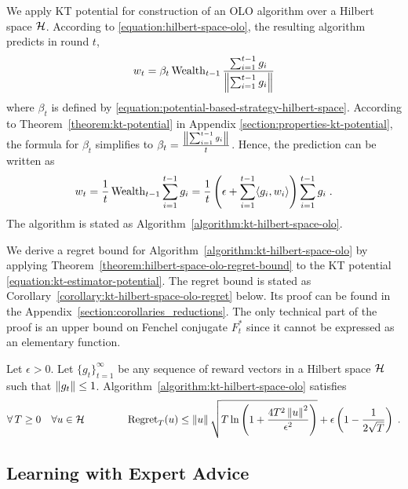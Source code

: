 We apply KT potential for construction of an OLO algorithm over a Hilbert
space $\mathcal{H}$. According to \eqref{equation:hilbert-space-olo}, the resulting algorithm predicts
in round $t$,
$$
w_t = \beta_t \operatorname{Wealth}_{t-1} \frac{\sum_{i=1}^{t-1} g_i}{\left\|{\sum_{i=1}^{t-1} g_i}\right\|}
$$
where $\beta_t$ is defined by
\eqref{equation:potential-based-strategy-hilbert-space}. According to
Theorem~\ref{theorem:kt-potential} in Appendix
\ref{section:properties-kt-potential}, the formula for $\beta_t$ simplifies to
$\beta_t = \frac{\left\|{\sum_{i=1}^{t-1} g_i}\right\|}{t}$. Hence, the prediction can be
written as
$$
w_t
= \frac{1}{t} \operatorname{Wealth}_{t-1} \sum_{i=1}^{t-1} g_i
= \frac{1}{t} \left(\epsilon + \sum_{i=1}^{t-1} \langle g_i, w_i \rangle \right) \sum_{i=1}^{t-1} g_i \; .
$$
The algorithm is stated as Algorithm~\ref{algorithm:kt-hilbert-space-olo}.

We derive a regret bound for Algorithm~\ref{algorithm:kt-hilbert-space-olo} by
applying Theorem~\ref{theorem:hilbert-space-olo-regret-bound} to the KT
potential \eqref{equation:kt-estimator-potential}. The regret bound is stated as
Corollary~\ref{corollary:kt-hilbert-space-olo-regret} below. Its proof can be
found in the Appendix~\ref{section:corollaries_reductions}. The only technical
part of the proof is an upper bound on Fenchel conjugate $F_t^*$ since it cannot
be expressed as an elementary function.

\begin{corollary}
\label{corollary:kt-hilbert-space-olo-regret}
Let $\epsilon > 0$. Let $\{g_t\}_{t=1}^\infty$ be any sequence of reward vectors
in a Hilbert space $\mathcal{H}$ such that $\left\|{g_t}\right\| \le 1$.
Algorithm~\ref{algorithm:kt-hilbert-space-olo} satisfies
$$
\forall \, T \ge 0 \quad
\forall u \in \mathcal{H} \qquad \qquad
\operatorname{Regret}_T(u) \le \left\|{u}\right\| \sqrt{T \ln\left(1 + \frac{4T^2 \left\|{u}\right\|^2}{\epsilon^2} \right)} + \epsilon \left(1 - \frac{1}{2\sqrt{T}} \right) \;.
$$
\end{corollary}

\subsection{Learning with Expert Advice}
\label{sec:kt-lea}


